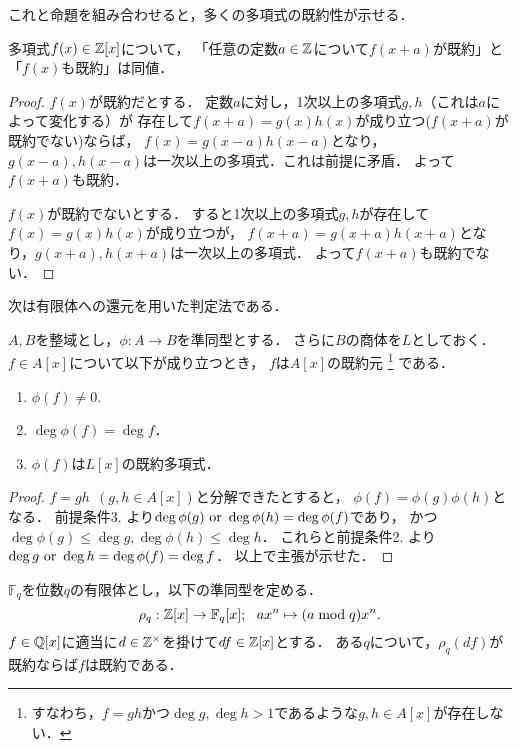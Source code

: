 \documentclass[a4j]{jsarticle}
\begin{document}
これと命題を組み合わせると，多くの多項式の既約性が示せる．
\begin{Prop}
    多項式$f(x) \in \mathbb{Z}[x]$について，
    「任意の定数$a \in \mathbb{Z}$について$f(x+a)$が既約」と「$f(x)$も既約」は同値．
\end{Prop}
\begin{proof}
    $f(x)$が既約だとする．
    定数$a$に対し，1次以上の多項式$g,h$（これは$a$によって変化する）が
    存在して$f(x+a)=g(x)h(x)$が成り立つ($f(x+a)$が既約でない)ならば，
    $f(x)=g(x-a)h(x-a)$となり，$g(x-a), h(x-a)$は一次以上の多項式．これは前提に矛盾．
    よって$f(x+a)$も既約．

    $f(x)$が既約でないとする．
    すると1次以上の多項式$g,h$が存在して$f(x)=g(x)h(x)$が成り立つが，
    $f(x+a)=g(x+a) h(x+a)$となり，$g(x+a), h(x+a)$は一次以上の多項式．
    よって$f(x+a)$も既約でない．
\end{proof}

次は有限体への還元を用いた判定法である．
\begin{Thm}
    $A,B$を整域とし，$\phi: A \to B$を準同型とする．
    さらに$B$の商体を$L$としておく．
    $f \in A[x]$について以下が成り立つとき，
    $f$は$A[x]$の既約元
    \footnote{すなわち，$f=gh$かつ$\deg g, \deg h >1$であるような$g,h \in A[x]$が存在しない．}
    である．
    \begin{enumerate}
        \item $\phi(f) \neq 0$.
        \item $\deg \phi(f)=\deg f$．
        \item $\phi(f)$は$L[x]$の既約多項式．
    \end{enumerate}
\end{Thm}
\begin{proof}
    $f=gh ~~(g,h \in A[x])$と分解できたとすると，
    $\phi(f)=\phi(g) \phi(h)$となる．
    前提条件3. より$\deg \phi(g) \text{ or } \deg \phi(h)=\deg \phi(f)$であり，
    かつ$\deg \phi(g) \leq \deg g, \deg \phi(h) \leq \deg h$．
    これらと前提条件2. より$\deg g \text{ or } \deg h=\deg \phi(f)=\deg f$．
    以上で主張が示せた．
\end{proof}

\begin{Cor}
    $\mathbb{F}_q$を位数$q$の有限体とし，以下の準同型を定める．
    \[ \rho_q: \mathbb{Z}[x] \to \mathbb{F}_q[x];~~ ax^n \mapsto (a \bmod q)x^n. \]
    $f \in \mathbb{Q}[x]$に適当に$d \in \mathbb{Z}^{\times}$を掛けて$df \in \mathbb{Z}[x]$とする．
    ある$q$について，$\rho_q(df)$が既約ならば$f$は既約である．
\end{Cor}
\end{document}
